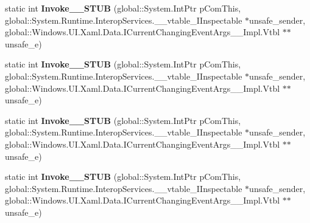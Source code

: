 \begin{DoxyCompactItemize}
\item 
\mbox{\label{struct_windows_1_1_u_i_1_1_xaml_1_1_data_1_1_current_changing_event_handler_____impl_1_1_vtbl_a908e1a64b2de3460311b698e135b938a}} 
static int {\bfseries Invoke\+\_\+\+\_\+\+S\+T\+UB} (global\+::\+System.\+Int\+Ptr p\+Com\+This, global\+::\+System.\+Runtime.\+Interop\+Services.\+\_\+\+\_\+vtable\+\_\+\+I\+Inspectable $\ast$unsafe\+\_\+sender, global\+::\+Windows.\+U\+I.\+Xaml.\+Data.\+I\+Current\+Changing\+Event\+Args\+\_\+\+\_\+\+Impl.\+Vtbl $\ast$$\ast$unsafe\+\_\+e)
\item 
\mbox{\label{struct_windows_1_1_u_i_1_1_xaml_1_1_data_1_1_current_changing_event_handler_____impl_1_1_vtbl_a908e1a64b2de3460311b698e135b938a}} 
static int {\bfseries Invoke\+\_\+\+\_\+\+S\+T\+UB} (global\+::\+System.\+Int\+Ptr p\+Com\+This, global\+::\+System.\+Runtime.\+Interop\+Services.\+\_\+\+\_\+vtable\+\_\+\+I\+Inspectable $\ast$unsafe\+\_\+sender, global\+::\+Windows.\+U\+I.\+Xaml.\+Data.\+I\+Current\+Changing\+Event\+Args\+\_\+\+\_\+\+Impl.\+Vtbl $\ast$$\ast$unsafe\+\_\+e)
\item 
\mbox{\label{struct_windows_1_1_u_i_1_1_xaml_1_1_data_1_1_current_changing_event_handler_____impl_1_1_vtbl_a908e1a64b2de3460311b698e135b938a}} 
static int {\bfseries Invoke\+\_\+\+\_\+\+S\+T\+UB} (global\+::\+System.\+Int\+Ptr p\+Com\+This, global\+::\+System.\+Runtime.\+Interop\+Services.\+\_\+\+\_\+vtable\+\_\+\+I\+Inspectable $\ast$unsafe\+\_\+sender, global\+::\+Windows.\+U\+I.\+Xaml.\+Data.\+I\+Current\+Changing\+Event\+Args\+\_\+\+\_\+\+Impl.\+Vtbl $\ast$$\ast$unsafe\+\_\+e)
\item 
\mbox{\label{struct_windows_1_1_u_i_1_1_xaml_1_1_data_1_1_current_changing_event_handler_____impl_1_1_vtbl_a908e1a64b2de3460311b698e135b938a}} 
static int {\bfseries Invoke\+\_\+\+\_\+\+S\+T\+UB} (global\+::\+System.\+Int\+Ptr p\+Com\+This, global\+::\+System.\+Runtime.\+Interop\+Services.\+\_\+\+\_\+vtable\+\_\+\+I\+Inspectable $\ast$unsafe\+\_\+sender, global\+::\+Windows.\+U\+I.\+Xaml.\+Data.\+I\+Current\+Changing\+Event\+Args\+\_\+\+\_\+\+Impl.\+Vtbl $\ast$$\ast$unsafe\+\_\+e)

\end{DoxyCompactItemize}
